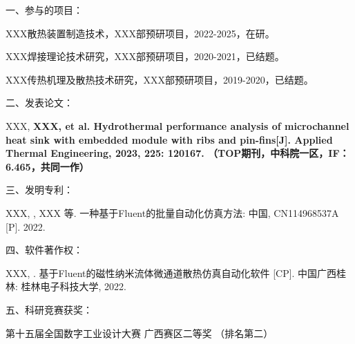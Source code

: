 
\noindent %
一、参与的项目：
\begingroup
\setlength{\itemsep}{0bp}\setlength{\parskip}{0pt}\small
    \begin{enumerate}[label={[\arabic*]}] %
        \item XXX散热装置制造技术，XXX部预研项目，2022-2025，在研。
        \item XXX焊接理论技术研究，XXX部预研项目，2020-2021，已结题。
        \item XXX传热机理及散热技术研究，XXX部预研项目，2019-2020，已结题。
        \end{enumerate}
\endgroup
\vspace{3mm}

\noindent %
二、发表论文：
\begingroup
\setlength{\itemsep}{0bp}\setlength{\parskip}{0pt}\small
    \begin{enumerate}[label={[\arabic*]}] 
        \item XXX, \bfseries{XXX}, et al. Hydrothermal performance analysis of microchannel heat sink with embedded module with ribs and pin-fins[J]. Applied Thermal Engineering, 2023, 225: 120167. （TOP期刊，中科院一区，IF：6.465，共同一作）
    \end{enumerate}
\endgroup
\vspace{3mm}

\noindent %
三、发明专利：
\begingroup
\setlength{\itemsep}{0bp}\setlength{\parskip}{0pt}\small
    \begin{enumerate}[label={[\arabic*]}]  
        \item XXX, , XXX 等. 一种基于Fluent的批量自动化仿真方法: 中国, CN114968537A [P]. 2022. 
    \end{enumerate}
\endgroup
\vspace{3mm}

\noindent %
四、软件著作权：
\begingroup
\setlength{\itemsep}{0bp}\setlength{\parskip}{0pt}\small
    \begin{enumerate}[label={[\arabic*]}]  
        \item XXX, . 基于Fluent的磁性纳米流体微通道散热仿真自动化软件 [CP]. 中国广西桂林: 桂林电子科技大学, 2022.
    \end{enumerate}
\endgroup
\vspace{3mm}

\noindent %
五、科研竞赛获奖：
\begingroup
    \setlength{\itemsep}{0bp}\setlength{\parskip}{0pt}\small
    \begin{enumerate}[label={[\arabic*]}]  
        \item 第十五届全国数字工业设计大赛 广西赛区二等奖 （排名第二）   
    \end{enumerate}
\endgroup


